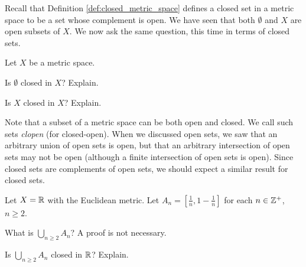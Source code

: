 \label{sec_closed_sets_metric}

Recall that Definition \ref{def:closed_metric_space} defines a closed set in a metric space to be a set whose complement is open. We have seen that both $\emptyset$ and $X$ are open subsets of $X$. We now ask the same question, this time in terms of closed sets.  


\begin{activity} Let $X$ be a metric space.
\ba
\item Is $\emptyset$ closed in $X$? Explain.

\item Is $X$ closed in $X$? Explain.

\ea

\end{activity}

\begin{comment}

\ActivitySolution

\ba
\item Since $X \setminus \emptyset = X$ and $X$ is open in $X$, it follows that $\emptyset$ is closed in $X$. 

\item Since $X \setminus X = \emptyset$ and $\emptyset$ is open in $X$, it follows that $X$ is closed in $X$. 

\ea

\end{comment}


Note that a subset of a metric space can be both open and closed. We call such sets \emph{clopen} (for closed-open). When we discussed open sets, we saw that an arbitrary union of open sets is open, but that an arbitrary intersection of open sets may not be open (although a finite intersection of open sets is open). Since closed sets are complements of open sets, we should expect a similar result for closed sets.  

\begin{activity} \label{act:Closed_union} Let $X = \mathbb{R}$ with the Euclidean metric. Let $A_n = \left[\frac{1}{n}, 1-\frac{1}{n}\right]$ for each $n \in \mathbb{Z}^+$, $n \geq 2$.
\ba
\item What is $\bigcup_{n \geq 2} A_n$? A proof is not necessary.
		
\item Is $\bigcup_{n \geq 2} A_n$ closed in $\mathbb{R}$? Explain.

\ea

\end{activity}

